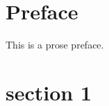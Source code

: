 \documentclass[12pt]{book}
\begin{document}
\BgThispage
\maketitle
\makededication
\frontmatter

\maketoc

\renewcommand*{\topname}{Table of Poems}

\maketop

\section{Preface}
This is a prose preface.

\newpage
\thispagestyle{empty}

\mainmatter
\newcommand{\introductionvar}{introduction_big.tex}

\newcommand{\chapterIvar}{../poem/big_mud.tex}

\newcommand{\chaptersvar}{chapters.tex}

\section{section 1}


\end{document}
